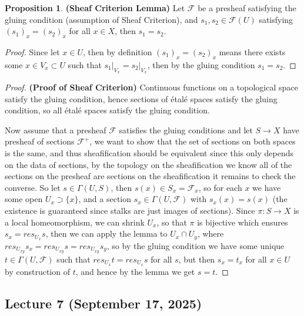 \documentclass[10.5pt]{article}
\theoremstyle{definition}
\newtheorem{proposition}{Proposition}
\newcommand{\set}[1]{\{#1\}}
\begin{document}
    \begin{proposition}\textbf{(Sheaf Criterion Lemma)}
        Let \(\mathcal{F}\) be a presheaf satisfying the gluing condition (assumption of Sheaf Criterion), and \(s_1,s_2 \in \mathcal{F}(U)\) satisfying \((s_1)_x = (s_2)_x\) for all \(x \in X\), then \(s_1 = s_2\).
    \end{proposition}
    \begin{proof}
        Since let \(x \in U\), then by definition \((s_1)_x = (s_2)_x\) means there exists some \(x \in V_x \subset U\) such that \(s_1\vert_{V_x} = s_2\vert_{V_x}\), then by the gluing condition \(s_1 = s_2\).
    \end{proof}
    \begin{proof}\textbf{(Proof of Sheaf Criterion)}
        Continuous functions on a topological space satisfy the gluing condition, hence sections of \'etal\'e spaces satisfy the gluing condition, so all \'etal\'e spaces satisfy the gluing condition.

        Now assume that a presheaf \(\mathcal{F}\) satisfies the gluing conditions and let \(S \to X\) have presheaf of sections \(\mathcal{F}^+\), we want to show that the set of sections on both spaces is the same, and thus sheafification should be equivalent since this only depends on the data of sections, by the topology on the sheafification we know all of the sections on the presheaf are sections on the sheafification it remains to check the converse. So let \(s \in \Gamma(U,S)\), then \(s(x) \in S_x = \mathcal{F}_x\), so for each \(x\) we have some open \(U_x \supset \set{x}\), and a section \(s_x \in \Gamma(U,\mathcal{F})\) with \(s_x(x) = s(x)\) (the existence is guaranteed since stalks are just images of sections). Since \(\pi: S \to X\) is a local homeomorphism, we can shrink \(U_x\), so that \(\pi\) is bijective which ensures \(s_x = res_{U_x}s\), then we can apply the lemma to \(U_x \cap U_y\), where \(res_{U_{xy}}s_x = res_{U_{xy}}s = res_{U_{xy}}s_y\), so by the gluing condition we have some unique \(t \in \Gamma(U,\mathcal{F})\) such that \(res_{U_x}t = res_{U_x}s\) for all \(s\), but then \(s_x = t_x\) for all \(x \in U\) by construction of \(t\), and hence by the lemma we get \(s = t\).
    \end{proof}

    \subsection{Lecture 7 (September 17, 2025)}
\end{document}
